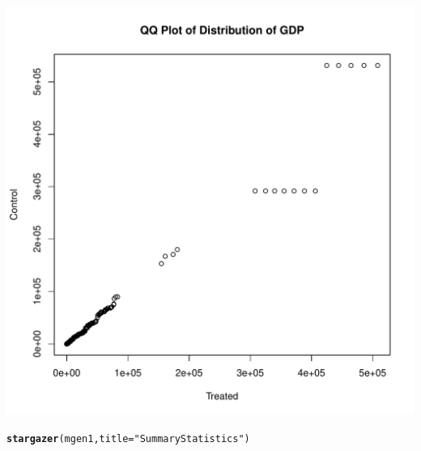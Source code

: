 \documentclass{article}\usepackage[]{graphicx}\usepackage[]{color}
\makeatletter
\def\maxwidth{ %
  \ifdim\Gin@nat@width>\linewidth
    \linewidth
  \else
    \Gin@nat@width
  \fi
}
\newcommand{\hlstr}[1]{\textcolor[rgb]{0.192,0.494,0.8}{#1}}%
\newcommand{\hlstd}[1]{\textcolor[rgb]{0.345,0.345,0.345}{#1}}%
\newcommand{\hlkwc}[1]{\textcolor[rgb]{0.333,0.667,0.333}{#1}}%
\newcommand{\hlkwd}[1]{\textcolor[rgb]{0.737,0.353,0.396}{\textbf{#1}}}%
\newenvironment{kframe}{%
 \def\at@end@of@kframe{}%
 \ifinner\ifhmode%
  \def\at@end@of@kframe{\end{minipage}}%
  \begin{minipage}{\columnwidth}%
 \fi\fi%
 \def\FrameCommand##1{\hskip\@totalleftmargin \hskip-\fboxsep
 \colorbox{shadecolor}{##1}\hskip-\fboxsep
     \hskip-\linewidth \hskip-\@totalleftmargin \hskip\columnwidth}%
 \MakeFramed {\advance\hsize-\width
   \@totalleftmargin\z@ \linewidth\hsize
   \@setminipage}}%
 {\par\unskip\endMakeFramed%
 \at@end@of@kframe}
\newenvironment{knitrout}{}{} %
\makeatother
\begin{document}
\begin{knitrout}
\includegraphics[width=\maxwidth]{figure/unnamed-chunk-3-5} 

\end{knitrout}

\begin{kframe}
\begin{alltt}
\hlkwd{stargazer}\hlstd{(mgen1,} \hlkwc{title} \hlstd{=} \hlstr{"Summary Statistics"}\hlstd{)}
\end{alltt}
\end{kframe}
\end{document}
